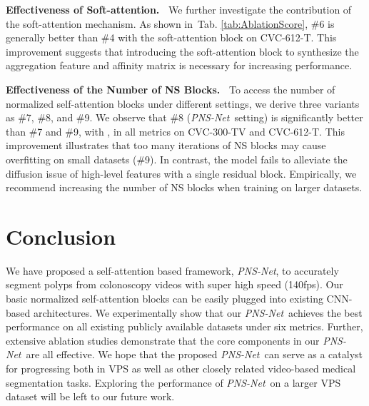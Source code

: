 \documentclass[runningheads]{llncs}
\newcommand{\tabref}[1]{Tab. \ref{#1}}
\def\ourmodel{\textit{PNS-Net}}
\newcommand{\myPara}[1]{\noindent\textbf{#1~}}
\begin{document}
\myPara{Effectiveness of Soft-attention.}
We further investigate the contribution of the soft-attention mechanism.
As shown in~\tabref{tab:AblationScore}, \#6 is generally better than \#4 with the soft-attention block on CVC-612-T.
This improvement suggests that introducing the soft-attention block to synthesize the aggregation feature and affinity matrix is necessary for increasing performance.

\myPara{Effectiveness of the Number of NS Blocks.}
To access the number of normalized self-attention blocks under different settings, we derive three variants as \#7, \#8, and \#9.
We observe that \#8 (\ourmodel~setting) is significantly better than \#7 and \#9, with , in all metrics on CVC-300-TV and CVC-612-T.
This improvement illustrates that too many iterations of NS blocks may cause overfitting on small datasets (\#9).
In contrast, the model fails to alleviate the diffusion issue of high-level features with a single residual block. Empirically, we recommend increasing the number of NS blocks when training on larger datasets.



\section{Conclusion}
We have proposed a self-attention based framework, \ourmodel, 
to accurately segment polyps from colonoscopy videos with super high speed (140fps).  
Our basic normalized self-attention blocks can be easily plugged into existing CNN-based architectures. 
We experimentally show that our \ourmodel~achieves the best performance on all existing publicly available datasets under six metrics.
Further, extensive ablation studies demonstrate that the core components in our \ourmodel~are all effective.
We hope that the proposed \ourmodel~can serve as a catalyst for progressing both in VPS as well as other closely related video-based medical segmentation tasks. 
Exploring the performance of \ourmodel~on a larger VPS dataset will be left to our future work.







\end{document}
